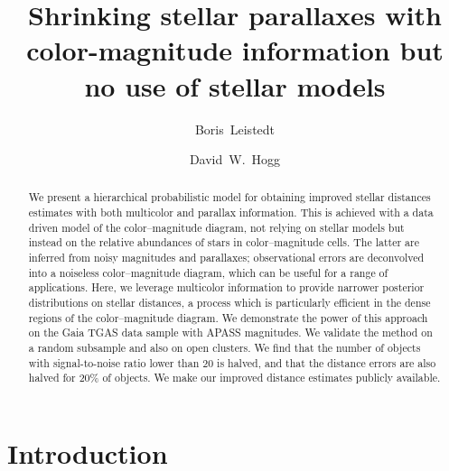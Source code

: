 \documentclass[aps,prd,showpacs,superscriptaddress,groupedaddress]{revtex4}  %
\begin{document}
 
\title{Shrinking stellar parallaxes with color-magnitude information but no use of stellar models}

\author{Boris~Leistedt}
   
\author{David~W.~Hogg}
  
\begin{abstract}
We present a hierarchical probabilistic model for obtaining improved stellar distances estimates with both multicolor and parallax information. 
This is achieved with a data driven model of the color--magnitude diagram, not relying on stellar models but instead on the  relative abundances of stars in color--magnitude cells.
The latter are inferred from noisy magnitudes and parallaxes; observational errors are deconvolved into a noiseless color--magnitude diagram, which can be useful for a range of applications.
Here, we leverage multicolor information to provide narrower posterior distributions on stellar distances, a process which is particularly efficient in the dense regions of the color--magnitude diagram.
We demonstrate the power of this approach on the Gaia TGAS data sample with APASS magnitudes.
We validate the method on a random subsample and also on open clusters.
We find that the number of objects with signal-to-noise ratio lower than 20 is halved, and that the distance errors are also halved for 20\% of objects.
We make our improved distance estimates publicly available.
\end{abstract}


\maketitle

  
\section{Introduction}


\end{document}

